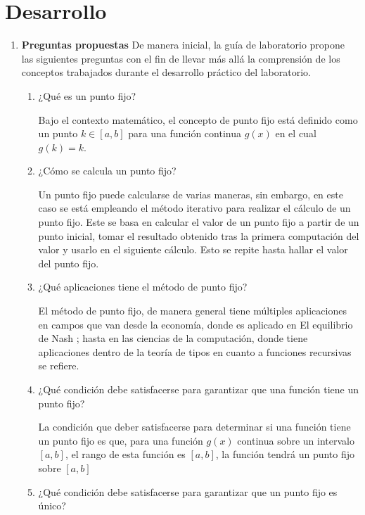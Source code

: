 \documentclass[spanish,notitlepage,letterpaper, 10pt]{article} %
\begin{document}
\section{Desarrollo}
\begin{enumerate}
  \item \textbf{Preguntas propuestas}
    De manera inicial, la guía de laboratorio propone las siguientes preguntas con el fin de llevar más allá la comprensión de los conceptos trabajados durante el desarrollo práctico del laboratorio.
    \begin{enumerate}
      \item ¿Qué es un punto fijo?
        
        Bajo el contexto matemático, el concepto de punto fijo está definido como un punto $k \in [a,b]$ para una función continua $g(x)$ en el cual $g(k) = k$. 
      
      \item ¿Cómo se calcula un punto fijo?
      
        Un punto fijo puede calcularse de varias maneras, sin embargo, en este caso se está empleando el método iterativo para realizar el cálculo de un punto fijo. Este se basa en calcular el valor de un punto fijo a partir de un punto inicial, tomar el resultado obtenido tras la primera computación del valor y usarlo en el siguiente cálculo. Esto se repite hasta hallar el valor del punto fijo.

      \item ¿Qué aplicaciones tiene el método de punto fijo?
      
      El método de punto fijo, de manera general tiene múltiples aplicaciones en campos que van desde la economía, donde es aplicado en El equilibrio de Nash \cite{nash}; hasta en las ciencias de la computación, donde tiene aplicaciones dentro de la teoría de tipos en cuanto a funciones recursivas se refiere. \cite{combinator}     

      \item ¿Qué condición debe satisfacerse para garantizar que una función tiene un punto fijo?
      
      La condición que deber satisfacerse para determinar si una función tiene un punto fijo es que, para una función $g(x)$ continua sobre un intervalo $[a,b]$, el rango de esta función es $[a,b]$, la función tendrá un punto fijo sobre $[a,b]$

      \item ¿Qué condición debe satisfacerse para garantizar que un punto fijo es único?
      

\end{enumerate}
\end{enumerate}
\end{document}
